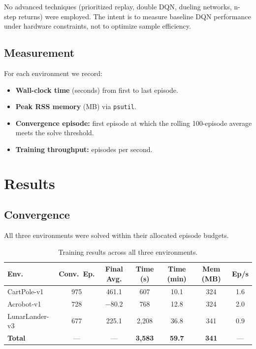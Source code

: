 \documentclass[11pt,a4paper]{article}
\begin{document}
No advanced techniques (prioritized replay, double DQN, dueling networks, n-step returns) were employed. The intent is to measure baseline DQN performance under hardware constraints, not to optimize sample efficiency.

\subsection{Measurement}

For each environment we record:
\begin{itemize}
    \item \textbf{Wall-clock time} (seconds) from first to last episode.
    \item \textbf{Peak RSS memory} (MB) via \texttt{psutil}.
    \item \textbf{Convergence episode:} first episode at which the rolling 100-episode average meets the solve threshold.
    \item \textbf{Training throughput:} episodes per second.
\end{itemize}

\section{Results}

\subsection{Convergence}

All three environments were solved within their allocated episode budgets.

\begin{table}[H]
\centering
\caption{Training results across all three environments.}
\label{tab:results}
\begin{tabular}{lcccccc}
\toprule
\textbf{Env.} & \textbf{Conv.\ Ep.} & \textbf{Final Avg.} & \textbf{Time (s)} & \textbf{Time (min)} & \textbf{Mem (MB)} & \textbf{Ep/s} \\
\midrule
CartPole-v1 & 975 & 461.1 & 607 & 10.1 & 324 & 1.6 \\
Acrobot-v1 & 728 & $-80.2$ & 768 & 12.8 & 324 & 2.0 \\
LunarLander-v3 & 677 & 225.1 & 2,208 & 36.8 & 341 & 0.9 \\
\midrule
\textbf{Total} & --- & --- & \textbf{3,583} & \textbf{59.7} & \textbf{341} & --- \\
\bottomrule
\end{tabular}
\end{table}
\end{document}
